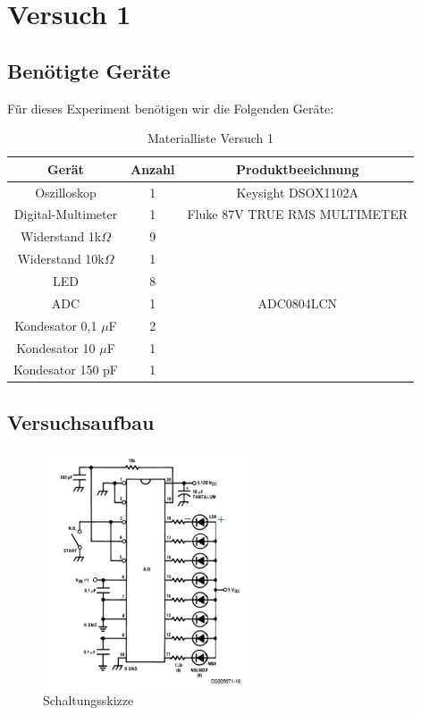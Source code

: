 \chapter{Versuch 1}

\section{Benötigte Geräte}

Für dieses Experiment benötigen wir die Folgenden Geräte:


\begin{table}[h]	
	\centering
	\begin{tabular}[h]{c|c|c}
		\centering
		Gerät & Anzahl & Produktbeeichnung\\
		\hline
		Oszilloskop & 1  & Keysight DSOX1102A\\
		\hline
		Digital-Multimeter & 1 & Fluke 87V TRUE RMS MULTIMETER\\
		\hline 
		Widerstand 1k$\Omega$ & 9 &  \\
		\hline 
		Widerstand 10k$\Omega$ & 1 &  \\
		\hline
		LED & 8 & \\
		\hline
		ADC & 1 & ADC0804LCN \\
		\hline
		Kondesator 0,1 $\mu$F & 2 & \\
		\hline
		Kondesator 10 $\mu$F & 1 & \\
		\hline
		Kondesator 150 pF & 1 & 
			\label{tab:Materialliste Versuch 1}
	\end{tabular}
	\caption{Materialliste Versuch 1}
	\label{tab:Materialliste Versuch 1}
\end{table}

\section{Versuchsaufbau}


\begin{figure}[H]
	\centering
	\includegraphics[height=7cm]{images/Schaltungsskizze-versuch-eins.jpg} 
	\caption[]{Schaltungsskizze}
	\label{fig: Schaltungsskizze}
\end{figure}

